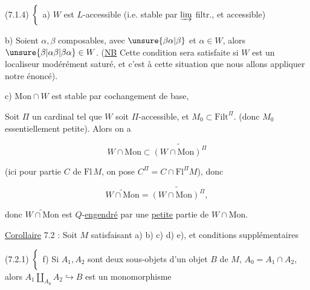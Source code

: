 

(7.1.4) $\left\{\vphantom{\dfrac{A}{A}}\right.$ a) $W$ est $L$-accessible (i.e. stable par $\varinjlim$ filtr., et accessible)

b) Soient $\alpha,\beta$ composables, avec $\unsure{\beta\alpha|\beta}$ et $\alpha\in W$, alors $\unsure{\beta|\alpha\beta|\beta\alpha}\in W$. (\uline{NB} Cette condition sera satisfaite si $W$ est un localiseur modérément saturé, et c'est à cette situation que nous allons appliquer notre énoncé).

c) $\mathrm{Mon}\cap W$ est stable par cochangement de base,


Soit $\Pi$ un cardinal tel que $W$ soit $\Pi$-accessible, et $M_0\subset\mathrm{Filt}^{\Pi}$. (donc $M_0$ essentiellement petite). Alors on a

\[
W\cap\mathrm{Mon}\subset\widetilde{(W\cap\mathrm{Mon})^\Pi}\tag*{(7.1.6)}
\]

(ici pour  partie $C$ de $\mathrm{Fl}\,M$, on pose $C^\Pi=C\cap\mathrm{Fl}^{\Pi}M$), donc

\[
\widetilde{W\cap\mathrm{Mon}}=\widetilde{(W\cap\mathrm{Mon})^\Pi},\tag*{(7.1.7)}
\]

donc $\widetilde{W\cap\mathrm{Mon}}$ est $Q$-\uline{engendré} par une \uline{petite} partie de $W\cap\mathrm{Mon}$.

\uline{Corollaire} 7.2 : Soit $M$ satisfaisant a) b) c) d) e), et  conditions supplémentaires 

(7.2.1) $\left\{\vphantom{\dfrac{A}{A}}\right.$  f) Si $A_1,A_2$ sont deux sous-objets d'un objet $B$ de $M$,  $A_0=A_1\cap A_2$, alors $A_1\amalg_{A_0} A_2\hookrightarrow B$ est un monomorphisme


